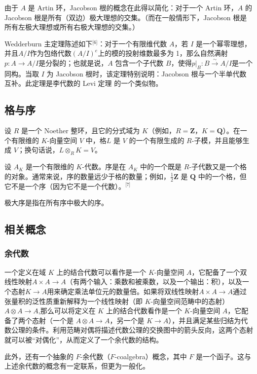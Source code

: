 由于 $A$ 是 Artin 环，Jacobson 根的概念在此得以简化：对于一个 Artin 环，$A$ 的 Jacobson 根是所有（双边）极大理想的交集。（而在一般情形下，Jacobson 根是所有左极大理想或所有右极大理想的交集。）

Wedderburn 主定理陈述如下\(^\text{[6]}\)：对于一个有限维代数 $A$，若 $I$ 是一个幂零理想，并且$A / I$作为包络代数$(A / I)^e$上的模的投射维数最多为 1，那么自然满射$p : A \to A / I$是分裂的；也就是说，$A$ 包含一个子代数 $B$，使得$p|_B : B \xrightarrow{\sim} A / I$是一个同构。当取 $I$ 为 Jacobson 根时，该定理特别说明：Jacobson 根与一个半单代数互补。此定理是李代数的 Levi 定理 的一个类似物。
\subsection{格与序}
设 $R$ 是一个 Noether 整环，且它的分式域为 $K$（例如，$R = \mathbf{Z}$，$K = \mathbf{Q}$）。在一个有限维的 $K$-向量空间 $V$ 中，格$L$ 是 $V$ 的一个有限生成的 $R$-子模，并且能够生成 $V$；换句话说，$L \otimes_R K = V$。

设 $A_K$ 是一个有限维的 $K$-代数。序是在 $A_K$ 中的一个既是 $R$-子代数又是一个格的对象。通常来说，序的数量远少于格的数量；例如，$\frac{1}{2} \mathbf{Z}$ 是 $\mathbf{Q}$ 中的一个格，但它不是一个序（因为它不是一个代数）。\(^\text{[7]}\)

极大序是指在所有序中极大的序。
\subsection{相关概念}
\subsubsection{余代数}
一个定义在域 $K$ 上的结合代数可以看作是一个 $K$-向量空间 $A$，它配备了一个双线性映射$A \times A \to A$（有两个输入：乘数和被乘数，以及一个输出：积），以及一个态射$K \to A$用来确定乘法单位元的数量倍。如果将双线性映射$A \times A \to A$通过张量积的泛性质重新解释为一个线性映射（即 $K$-向量空间范畴中的态射）$A \otimes A \to A$,那么可以将定义在 $K$ 上的结合代数看作是一个 $K$-向量空间 $A$，它配备了两个态射（一个是 $A \otimes A \to A$，另一个是 $K \to A$），并且满足某些归结为代数公理的条件。利用范畴对偶将描述代数公理的交换图中的箭头反向，这两个态射就可以被“对偶化”，从而定义了一个余代数的结构。

此外，还有一个抽象的 $F$-余代数（$F$-coalgebra）概念，其中 $F$ 是一个函子。这与上述余代数的概念有一定联系，但更为一般化。
